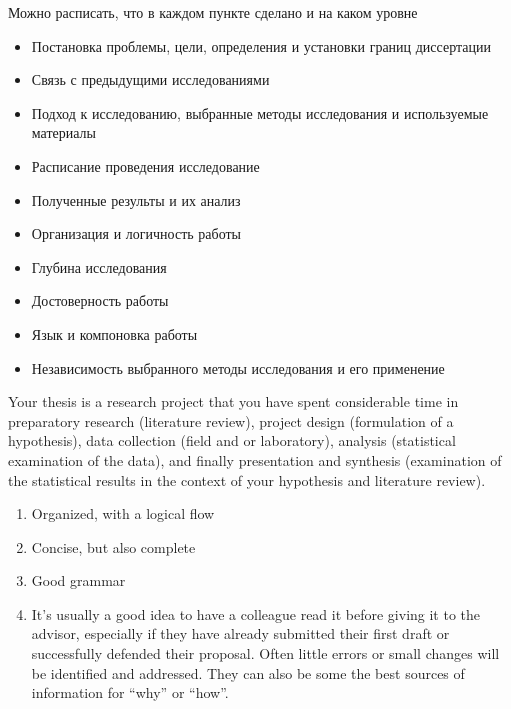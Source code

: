 

\begin{suggestions}
Можно расписать, что в каждом пункте сделано и на каком уровне
\end{suggestions}

\begin{itemize}
  \item Постановка проблемы, цели, определения и установки границ диссертации
  \item Связь с предыдущими исследованиями
  \item Подход к исследованию, выбранные методы исследования и используемые материалы
  \item Расписание проведения исследование
  \item Полученные результы и их анализ
  \item Организация и логичность работы
  \item Глубина исследования
  \item Достоверность работы
  \item Язык и компоновка работы
  \item Независимость выбранного методы исследования и его применение
\end{itemize}

Your  thesis is a research project that you have spent considerable time in preparatory research
(literature review), project design (formulation of a hypothesis), data collection (field and or 
laboratory), analysis (statistical examination of the data), and finally presentation and synthesis
(examination of the statistical results in the context of your hypothesis and literature review). 

\begin{enumerate}
	\item Organized, with a logical flow 
	\item Concise, but also complete
	\item Good grammar
	\item It’s usually a good idea to have a colleague read it before giving it to the advisor,
	especially if they have already submitted their first draft or successfully defended their
	proposal. Often little errors or small changes will be identified and addressed. 
	They can also be some the best sources of information for “why” or “how”. 
\end{enumerate}

